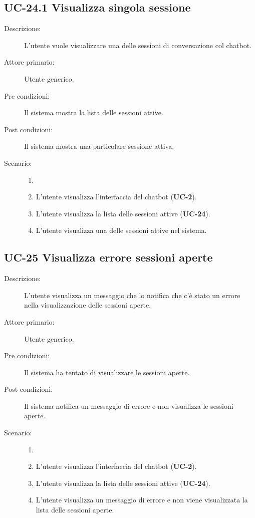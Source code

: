 \subsection{UC-24.1 Visualizza singola sessione}
\begin{description}
    \item[Descrizione:] L'utente vuole visualizzare una delle sessioni di conversazione col chatbot.
    \item[Attore primario:] Utente generico.
    \item[Pre condizioni:] Il sistema mostra la lista delle sessioni attive.
        \item[Post condizioni:] Il sistema mostra una particolare sessione attiva.
    \item[Scenario:] 
    \begin{enumerate}
        \item[] 
        \item L’utente visualizza l'interfaccia del chatbot (\textbf{UC-2}).
        \item L'utente visualizza la lista delle sessioni attive (\textbf{UC-24}).
        \item L'utente visualizza una delle sessioni attive nel sistema.
    \end{enumerate}
\end{description}

\subsection{UC-25 Visualizza errore sessioni aperte }
\begin{description}
    \item[Descrizione:] L'utente visualizza un messaggio che lo notifica che c'è stato un errore nella visualizzazione delle sessioni aperte.
    \item[Attore primario:] Utente generico.
    \item[Pre condizioni:] Il sistema ha tentato di visualizzare le sessioni aperte.
    \item[Post condizioni:] Il sistema notifica un messaggio di errore e non visualizza le sessioni aperte.
    \item[Scenario:] 
    \begin{enumerate}
        \item[] 
        \item L’utente visualizza l'interfaccia del chatbot (\textbf{UC-2}).
        \item L'utente visualizza la lista delle sessioni attive (\textbf{UC-24}).
        \item L'utente visualizza un messaggio di errore e non viene visualizzata la lista delle sessioni aperte.
    \end{enumerate}
\end{description}

